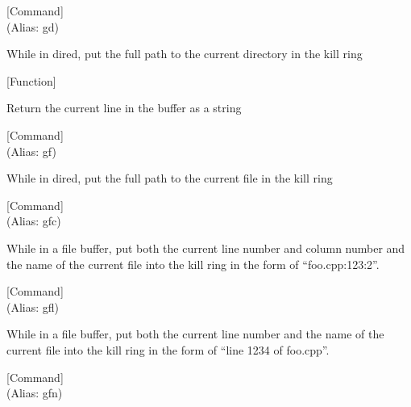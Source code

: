 \vspace{1em}
\noindent
{}
\usebox{\funcname}
 \hfill [Command]\\%
 (Alias: gd)

\begin{doc-string}
While in dired, put the full path to the current directory in the kill ring
\end{doc-string}

\vspace{1em}
\noindent
{}
\usebox{\funcname}
 \hfill [Function]

\begin{doc-string}
Return the current line in the buffer as a string
\end{doc-string}

\vspace{1em}
\noindent
{}
\usebox{\funcname}
 \hfill [Command]\\%
 (Alias: gf)

\begin{doc-string}
While in dired, put the full path to the current file in the kill ring
\end{doc-string}

\vspace{1em}
\noindent
{}
\usebox{\funcname}
 \hfill [Command]\\%
 (Alias: gfc)

\begin{doc-string}
While in a file buffer, put both the current line number and
column number and the name of the current file into the kill ring
in the form of ``foo.cpp:123:2''.
\end{doc-string}

\vspace{1em}
\noindent
{}
\usebox{\funcname}
 \hfill [Command]\\%
 (Alias: gfl)

\begin{doc-string}
While in a file buffer, put both the current line number and the name of the current
file into the kill ring in the form of ``line 1234 of foo.cpp''.
\end{doc-string}

\vspace{1em}
\noindent
{}
\usebox{\funcname}
 \hfill [Command]\\%
 (Alias: gfn)

